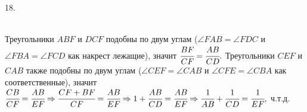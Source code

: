 18. \begin{figure}[ht!]
\end{figure}\\
Треугольники $ABF$ и $DCF$ подобны по двум углам ($\angle FAB=\angle FDC$ и $\angle FBA=\angle FCD$ как накрест лежащие), значит $\cfrac{BF}{CF}=\cfrac{AB}{CD}.$ Треугольники $CEF$ и $CAB$ также подобны по двум углам ($\angle CEF=\angle CAB$ и $\angle CFE=\angle CBA$ как соответственные), значит $\cfrac{CB}{CF}=\cfrac{AB}{EF}\Rightarrow \cfrac{CF+BF}{CF}=\cfrac{AB}{EF}\Rightarrow 1+\cfrac{AB}{CD}=\cfrac{AB}{EF}
\Rightarrow \cfrac{1}{AB}+\cfrac{1}{CD}=\cfrac{1}{EF},$ ч.т.д.\\
